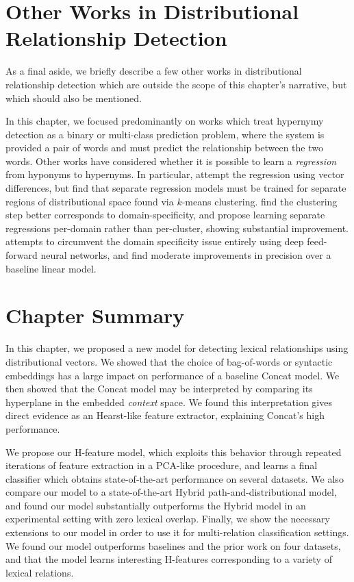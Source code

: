 \section{Other Works in Distributional Relationship Detection}

As a final aside, we briefly describe a few other works in distributional
relationship detection which are outside the scope of this chapter's narrative,
but which should also be mentioned.

In this chapter, we focused predominantly on works which treat hypernymy detection as a binary
or multi-class prediction problem, where the system is provided a pair of
words and must predict the relationship between the two words.
Other works have considered whether it is possible to learn a {\em
regression} from hyponyms to hypernyms. In particular, 
attempt the regression using vector differences, but find that separate
regression models must be trained for separate regions of distributional
space found via $k$-means clustering.  find
the clustering step better corresponds to domain-specificity, and propose
learning separate regressions per-domain rather than per-cluster, showing
substantial improvement.   attempts to
circumvent the domain specificity issue entirely using deep feed-forward neural
networks, and find moderate improvements in precision over a baseline linear
model.


\section{Chapter Summary}

In this chapter, we proposed a new model for detecting lexical relationships
using distributional vectors. We showed that the choice of bag-of-words
or syntactic embeddings has a large impact on performance of a baseline
Concat model. We then showed that the Concat model may be interpreted by
comparing its hyperplane in the embedded {\em context} space. We found
this interpretation gives direct evidence as an Hearst-like feature extractor,
explaining Concat's high performance.

We propose our H-feature
model, which exploits this behavior through repeated iterations of feature
extraction in a PCA-like procedure, and learns a final classifier which obtains
state-of-the-art performance on several datasets. We also compare our model
to a state-of-the-art Hybrid path-and-distributional model, and found our
model substantially outperforms the Hybrid model in an experimental setting
with zero lexical overlap. Finally, we show the necessary extensions to our
model in order to use it for multi-relation classification settings. We found
our model outperforms baselines and the prior work on four datasets, and that
the model learns interesting H-features corresponding to a variety of
lexical relations.

